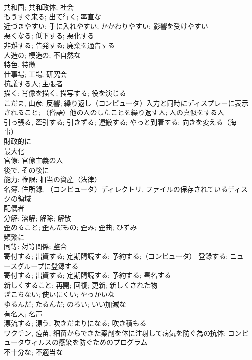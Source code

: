 \documentclass[8pt]{extreport}
\begin{document}
\begin{CJK}{UTF8}{min}
\\	共和国; 共和政体; 社会	
\\	もうすぐ来る; 出て行く; 率直な	
\\	近づきやすい; 手に入れやすい; かかわりやすい; 影響を受けやすい	
\\	悪くなる; 低下する; 悪化する	
\\	非難する; 告発する; 廃棄を通告する	
\\	人造の; 模造の; 不自然な	
\\	特色, 特徴	
\\	仕事場; 工場; 研究会	
\\	抗議する人; 主張者	
\\	描く; 肖像を描く; 描写する; 役を演じる	
\\	こだま, 山彦; 反響; 繰り返し（コンピュータ）入力と同時にディスプレーに表示されること; （俗語）他の人のしたことを繰り返す人; 人の真似をする人	
\\	引っ張る, 牽引する; 引きずる; 運搬する; やっと到着する; 向きを変える（海事）	
\\	財政的に	
\\	最大化	
\\	官僚; 官僚主義の人	
\\	後で, その後に	
\\	能力; 権限; 相当の資産（法律）	
\\	名簿, 住所録; （コンピュータ）ディレクトリ, ファイルの保存されているディスクの領域	
\\	配偶者	
\\	分解; 溶解; 解除; 解散	
\\	歪めること; 歪んだもの; 歪み; 歪曲; ひずみ	
\\	頻繁に	
\\	同等; 対等関係; 整合	
\\	寄付する; 出資する; 定期購読する; 予約する;（コンピュータ） 登録する; ニュースグループに登録する 
\\	寄付する; 出資する; 定期購読する; 予約する; 署名する	
\\	新しくすること; 再開; 回復; 更新; 新しくされた物	
\\	ぎこちない; 使いにくい; やっかいな	
\\	ゆるんだ; たるんだ; のろい; いい加減な	
\\	有名人; 名声	
\\	漂流する; 漂う; 吹きだまりになる; 吹き積もる	
\\	ワクチン, 痘苗, 細菌からできた薬剤を体に注射して病気を防ぐ為の抗体; コンピュータウィルスの感染を防ぐためのプログラム	
\\	不十分な; 不適当な	

\end{CJK}
\end{document}
